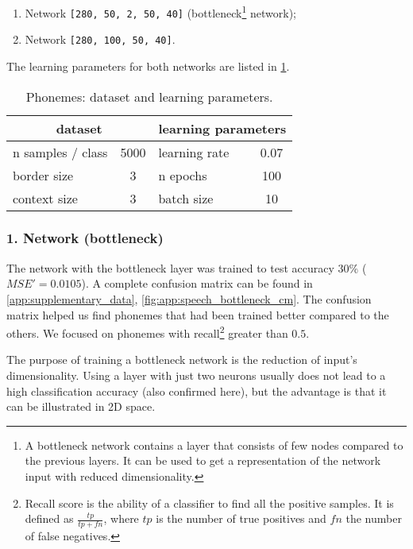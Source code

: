 \begin{enumerate}
\item Network \texttt{[280, 50, 2, 50, 40]} (bottleneck\footnote{A bottleneck network contains a layer that consists of few nodes compared to the previous layers. It can be used to get a representation of the network input with reduced dimensionality.} network);
\item Network \texttt{[280, 100, 50, 40]}.
\end{enumerate}

The learning parameters for both networks are listed in \cref{tab:examples:speech_learning_parameters}.

\begin{table}[H]
\centering
\begin{tabular}{|l|c|l|c|}
\hline
\multicolumn{2}{|c|}{dataset} & \multicolumn{2}{c|}{learning parameters} \\ \hline
n samples / class    & 5000   & learning rate            & 0.07          \\ \hline
border size          & 3      & n epochs                 & 100           \\ \hline
context size         & 3      & batch size               & 10            \\ \hline
\end{tabular}
\caption{Phonemes: dataset and learning parameters.}
\label{tab:examples:speech_learning_parameters}
\end{table}

\subsubsection*{1. Network (bottleneck)}
The network with the bottleneck layer was trained to test accuracy $ 30\% $ ($ MSE' = 0.0105 $). A complete confusion matrix can be found in \cref{app:supplementary_data}, \cref{fig:app:speech_bottleneck_cm}. The confusion matrix helped us find phonemes that had been trained better compared to the others. We focused on phonemes with recall\footnote{Recall score is the ability of a classifier to find all the positive samples. It is defined as $ \frac{tp}{tp+fn} $, where $ tp $ is the number of true positives and $ fn $ the number of false negatives.} greater than $ 0.5 $.

The purpose of training a bottleneck network is the reduction of input's dimensionality. Using a layer with just two neurons usually does not lead to a high classification accuracy (also confirmed here), but the advantage is that it can be illustrated in 2D space.

